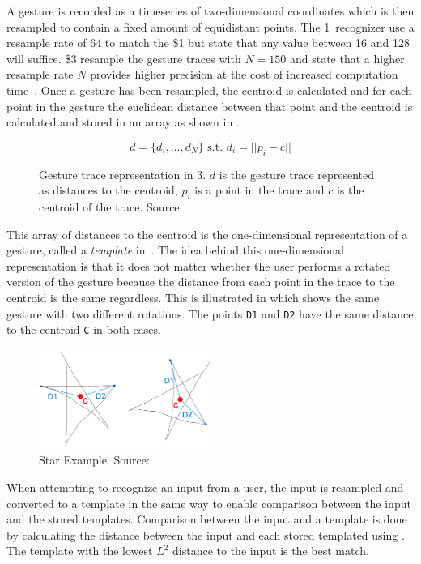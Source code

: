 A gesture is recorded as a timeseries of two-dimensional coordinates which is then resampled to contain a fixed amount of equidistant points.
The 1\textcent~recognizer use a resample rate of 64 to match the \$1 but state that any value between 16 and 128 will suffice.
\$3 resample the gesture traces with $N = 150$ and state that a higher resample rate $N$ provides higher precision at the cost of increased computation time~\cite[p. 342]{threedollar}.
Once a gesture has been resampled, the centroid is calculated and for each point in the gesture the euclidean distance between that point and the centroid is calculated and stored in an array as shown in .

\begin{figure}[h]
\[ d = \{d_i,\ldots,d_N\} \text{ s.t. } d_i=||p_i-c|| \]
\caption{Gesture trace representation in 3\textcent. $d$ is the gesture trace represented as distances to the centroid, $p_i$ is a point in the trace and $c$ is the centroid of the trace. Source:~\cite{herold20121}}
\label{eq:one-cent-trace}
\end{figure}

This array of distances to the centroid is the one-dimensional representation of a gesture, called a \emph{template} in~\cite{herold20121}.
The idea behind this one-dimensional representation is that it does not matter whether the user performs a rotated version of the gesture because the distance from each point in the trace to the centroid is the same regardless.
This is illustrated in  which shows the same gesture with two different rotations.
The points \texttt{D1} and \texttt{D2} have the same distance to the centroid \texttt{C} in both cases.

\begin{figure}[h]
\centering
\includegraphics[width=0.5\textwidth]{images/one-cent-star-example}
\caption{Star Example. Source:~\cite{herold20121}}
\label{fig:one-cent-star}
\end{figure}

When attempting to recognize an input from a user, the input is resampled and converted to a template in the same way to enable comparison between the input and the stored templates.
Comparison between the input and a template is done by calculating the distance between the input and each stored templated using .
The template with the lowest $L^2$ distance to the input is the best match.

